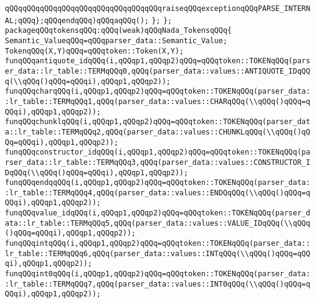 \verb|qQQqqQQqqQQqqQQqqQQqqQQqqQQqqQQqqQQqraiseqQQqexceptionqQQqPARSE_INTERNAL;qQQq};qQQqendqQQq)qQQqaqQQq();|\newline
\verb|};|\newline
\verb|};|\newline
\verb|packageqQQqtokensqQQq:qQQq(weak)qQQqNada_TokensqQQq{|\newline
\verb|Semantic_ValueqQQq=qQQqparser_data::Semantic_Value;|\newline
\verb|TokenqQQq(X,Y)qQQq=qQQqtoken::Token(X,Y);|\newline
\verb|funqQQqantiquote_idqQQq(i,qQQqp1,qQQqp2)qQQq=qQQqtoken::TOKENqQQq(parser_data::lr_table::TERMqQQq0,qQQq(parser_data::values::ANTIQUOTE_IDqQQq(\\qQQq()qQQq=qQQqi),qQQqp1,qQQqp2));|\newline
\verb|funqQQqcharqQQq(i,qQQqp1,qQQqp2)qQQq=qQQqtoken::TOKENqQQq(parser_data::lr_table::TERMqQQq1,qQQq(parser_data::values::CHARqQQq(\\qQQq()qQQq=qQQqi),qQQqp1,qQQqp2));|\newline
\verb|funqQQqchunklqQQq(i,qQQqp1,qQQqp2)qQQq=qQQqtoken::TOKENqQQq(parser_data::lr_table::TERMqQQq2,qQQq(parser_data::values::CHUNKLqQQq(\\qQQq()qQQq=qQQqi),qQQqp1,qQQqp2));|\newline
\verb|funqQQqconstructor_idqQQq(i,qQQqp1,qQQqp2)qQQq=qQQqtoken::TOKENqQQq(parser_data::lr_table::TERMqQQq3,qQQq(parser_data::values::CONSTRUCTOR_IDqQQq(\\qQQq()qQQq=qQQqi),qQQqp1,qQQqp2));|\newline
\verb|funqQQqendqqQQq(i,qQQqp1,qQQqp2)qQQq=qQQqtoken::TOKENqQQq(parser_data::lr_table::TERMqQQq4,qQQq(parser_data::values::ENDQqQQq(\\qQQq()qQQq=qQQqi),qQQqp1,qQQqp2));|\newline
\verb|funqQQqvalue_idqQQq(i,qQQqp1,qQQqp2)qQQq=qQQqtoken::TOKENqQQq(parser_data::lr_table::TERMqQQq5,qQQq(parser_data::values::VALUE_IDqQQq(\\qQQq()qQQq=qQQqi),qQQqp1,qQQqp2));|\newline
\verb|funqQQqintqQQq(i,qQQqp1,qQQqp2)qQQq=qQQqtoken::TOKENqQQq(parser_data::lr_table::TERMqQQq6,qQQq(parser_data::values::INTqQQq(\\qQQq()qQQq=qQQqi),qQQqp1,qQQqp2));|\newline
\verb|funqQQqint0qQQq(i,qQQqp1,qQQqp2)qQQq=qQQqtoken::TOKENqQQq(parser_data::lr_table::TERMqQQq7,qQQq(parser_data::values::INT0qQQq(\\qQQq()qQQq=qQQqi),qQQqp1,qQQqp2));|\newline
